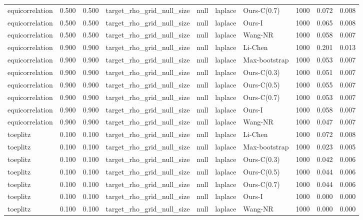 \begin{tabular}{lrrllllrrr}
equicorrelation & 0.500 & 0.500 & target\_rho\_grid\_null\_size & null & laplace & Ours-C(0.7) & 1000 & 0.072 & 0.008 \\
equicorrelation & 0.500 & 0.500 & target\_rho\_grid\_null\_size & null & laplace & Ours-I & 1000 & 0.065 & 0.008 \\
equicorrelation & 0.500 & 0.500 & target\_rho\_grid\_null\_size & null & laplace & Wang-NR & 1000 & 0.058 & 0.007 \\
equicorrelation & 0.900 & 0.900 & target\_rho\_grid\_null\_size & null & laplace & Li-Chen & 1000 & 0.201 & 0.013 \\
equicorrelation & 0.900 & 0.900 & target\_rho\_grid\_null\_size & null & laplace & Max-bootstrap & 1000 & 0.053 & 0.007 \\
equicorrelation & 0.900 & 0.900 & target\_rho\_grid\_null\_size & null & laplace & Ours-C(0.3) & 1000 & 0.051 & 0.007 \\
equicorrelation & 0.900 & 0.900 & target\_rho\_grid\_null\_size & null & laplace & Ours-C(0.5) & 1000 & 0.055 & 0.007 \\
equicorrelation & 0.900 & 0.900 & target\_rho\_grid\_null\_size & null & laplace & Ours-C(0.7) & 1000 & 0.053 & 0.007 \\
equicorrelation & 0.900 & 0.900 & target\_rho\_grid\_null\_size & null & laplace & Ours-I & 1000 & 0.058 & 0.007 \\
equicorrelation & 0.900 & 0.900 & target\_rho\_grid\_null\_size & null & laplace & Wang-NR & 1000 & 0.047 & 0.007 \\
toeplitz & 0.100 & 0.100 & target\_rho\_grid\_null\_size & null & laplace & Li-Chen & 1000 & 0.072 & 0.008 \\
toeplitz & 0.100 & 0.100 & target\_rho\_grid\_null\_size & null & laplace & Max-bootstrap & 1000 & 0.023 & 0.005 \\
toeplitz & 0.100 & 0.100 & target\_rho\_grid\_null\_size & null & laplace & Ours-C(0.3) & 1000 & 0.042 & 0.006 \\
toeplitz & 0.100 & 0.100 & target\_rho\_grid\_null\_size & null & laplace & Ours-C(0.5) & 1000 & 0.044 & 0.006 \\
toeplitz & 0.100 & 0.100 & target\_rho\_grid\_null\_size & null & laplace & Ours-C(0.7) & 1000 & 0.044 & 0.006 \\
toeplitz & 0.100 & 0.100 & target\_rho\_grid\_null\_size & null & laplace & Ours-I & 1000 & 0.000 & 0.000 \\
toeplitz & 0.100 & 0.100 & target\_rho\_grid\_null\_size & null & laplace & Wang-NR & 1000 & 0.000 & 0.000 \\

\end{tabular}
